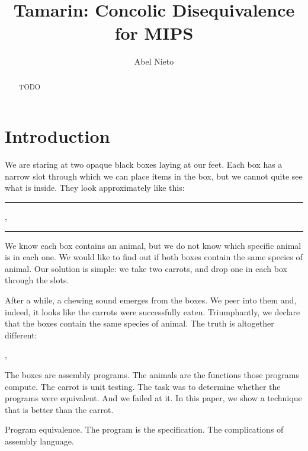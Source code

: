 \documentclass{llncs}
\title{Tamarin: Concolic Disequivalence for MIPS}
\author{Abel Nieto}
\institute{
University of Waterloo\\
\email{anietoro@uwaterloo.ca}
}
\newcommand{\crule}[3][black]{\textcolor{#1}{\rule{#2}{#3}}}
\begin{document}
\maketitle

\begin{abstract}
TODO
\end{abstract}

\section{Introduction}

We are staring at two opaque black boxes laying at our feet. Each box has a narrow slot through which we can place items in the box, but we cannot quite see what is inside. They look approximately like this:

\vspace{1mm}
\crule{1.5cm}{1.5cm}, \crule{1.5cm}{1.5cm}
\vspace{1mm}

We know each box contains an animal, but we do not know which specific animal is in each one. We would like to find out if both boxes contain the same species of animal. Our solution is simple: we take two carrots, and drop one in each box through the slots.

After a while, a chewing sound emerges from the boxes. We peer into them and, indeed, it looks like the carrots were successfully eaten. Triumphantly, we declare that the boxes contain the same species of animal. The truth is altogether different:

\vspace{1mm}
, 
\vspace{1mm}

The boxes are assembly programs. The animals are the functions those programs compute. The carrot is unit testing. The task was to determine whether the programs were equivalent. And we failed at it. In this paper, we show a technique that is better than the carrot.

Program equivalence. The program is the specification. The complications of assembly language.
\end{document}
